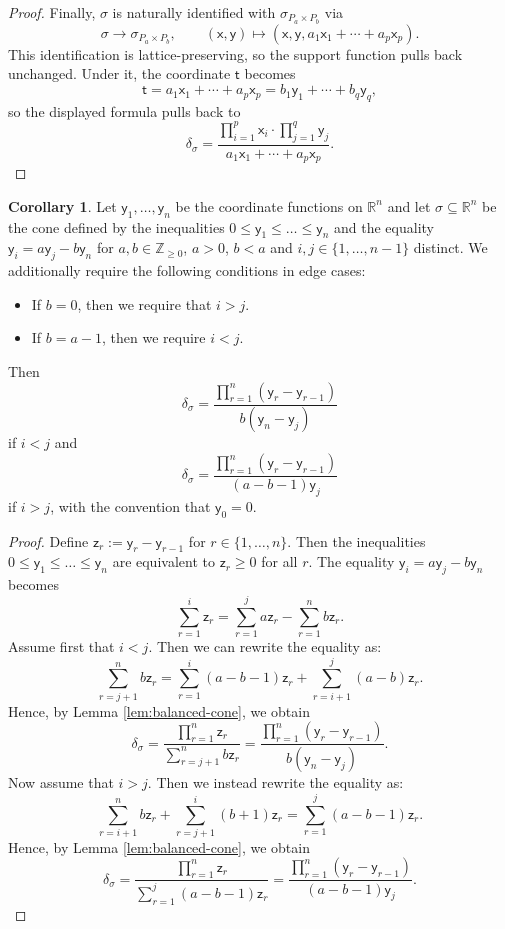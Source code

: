 \documentclass[11pt]{article}
\theoremstyle{definition}
\newtheorem{corollary}[definition]{Corollary}
\begin{document}
\begin{proof}
	Finally, $\sigma$ is naturally identified with $\sigma_{P_a\times P_b}$ via
	\[
		\sigma\longrightarrow \sigma_{P_a\times P_b},
		\qquad
		(\mathsf{x},\mathsf{y})\longmapsto (\mathsf{x},\mathsf{y},a_1\mathsf{x}_1+\cdots+a_p\mathsf{x}_p).
	\]
	This identification is lattice-preserving, so the support function pulls back unchanged. Under it, the coordinate $\mathsf{t}$ becomes
	\[
		\mathsf{t}=a_1\mathsf{x}_1+\cdots+a_p\mathsf{x}_p=b_1\mathsf{y}_1+\cdots+b_q\mathsf{y}_q,
	\]
	so the displayed formula pulls back to
	\[
		\delta_\sigma=\frac{\prod_{i=1}^p \mathsf{x}_i\cdot \prod_{j=1}^q \mathsf{y}_j}{a_1\mathsf{x}_1+\cdots+a_p\mathsf{x}_p}.
	\]
\end{proof}

\begin{corollary}
	\label{cor:ineq_cone}
	Let $\mathsf{y}_1,\dots,\mathsf{y}_n$ be the coordinate functions on $\mathbb{R}^{n}$ and let
	$\sigma\subseteq \mathbb{R}^{n}$ be the cone defined by the inequalities $0\le \mathsf{y}_1\le \dots\le \mathsf{y}_n$
	and the equality $\mathsf{y}_i=a\mathsf{y}_j-b\mathsf{y}_n$ for $a,b\in \mathbb{Z}_{\ge 0}$, $a>0$, $b<a$ and $i,j\in \{1,\dots,n-1\}$
	distinct. We additionally require the following conditions in edge cases:
	\begin{itemize}
		\item If $b=0$, then we require that $i>j$.
		\item If $b=a-1$, then we require $i<j$.
	\end{itemize}
	Then
	$$\delta_{\sigma}=\frac{\prod_{r=1}^n (\mathsf{y}_r-\mathsf{y}_{r-1})}{b(\mathsf{y}_n-\mathsf{y}_j)}$$
	if $i<j$ and
	$$\delta_{\sigma}=\frac{\prod_{r=1}^n (\mathsf{y}_r-\mathsf{y}_{r-1})}{(a-b-1)\mathsf{y}_j}$$
	if $i>j$, with the convention that $\mathsf{y}_0=0$.
\end{corollary}

\begin{proof}
	Define $\mathsf{z}_r:=\mathsf{y}_{r}-\mathsf{y}_{r-1}$ for $r\in \{1,\dots,n\}$. Then the inequalities
	$0\le \mathsf{y}_1\le\dots\le \mathsf{y}_n$ are equivalent to $\mathsf{z}_r\ge 0$ for all $r$. The equality $\mathsf{y}_i=a\mathsf{y}_j-b\mathsf{y}_n$ becomes
	$$\sum_{r=1}^{i}\mathsf{z}_r=\sum_{r=1}^{j}a\mathsf{z}_r-\sum_{r=1}^{n}b\mathsf{z}_r.$$
	Assume first that $i<j$. Then we can rewrite the equality as:
	$$\sum_{r=j+1}^{n}b\mathsf{z}_r=\sum_{r=1}^{i}(a-b-1)\mathsf{z}_r+\sum_{r=i+1}^{j}(a-b)\mathsf{z}_r.$$
	Hence, by Lemma \ref{lem:balanced-cone}, we obtain
	$$\delta_{\sigma}=\frac{\prod_{r=1}^n \mathsf{z}_r}{\sum_{r=j+1}^{n}b\mathsf{z}_r}=\frac{\prod_{r=1}^n (\mathsf{y}_r-\mathsf{y}_{r-1})}{b(\mathsf{y}_n-\mathsf{y}_j)}.$$
	Now assume that $i>j$. Then we instead rewrite the equality as:
	$$\sum_{r=i+1}^{n}b\mathsf{z}_r+\sum_{r=j+1}^{i}(b+1)\mathsf{z}_r=\sum_{r=1}^{j}(a-b-1)\mathsf{z}_r.$$
	Hence, by Lemma \ref{lem:balanced-cone}, we obtain
	$$\delta_{\sigma}=\frac{\prod_{r=1}^n \mathsf{z}_r}{\sum_{r=1}^{j}(a-b-1)\mathsf{z}_r}=\frac{\prod_{r=1}^n (\mathsf{y}_r-\mathsf{y}_{r-1})}{(a-b-1)\mathsf{y}_j}.$$
\end{proof}
\end{document}
